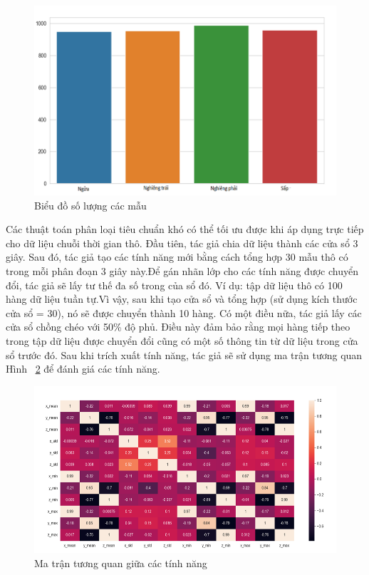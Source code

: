 \begin{figure} [!]
    \centering
    \includegraphics[width=0.75\linewidth]{images/hocmay_mau.png}
    \caption{Biểu đồ số lượng các mẫu}
    \label{hocmay_mau}
\end{figure}

Các thuật toán phân loại tiêu chuẩn khó có thể tối ưu được khi áp dụng trực tiếp cho dữ liệu chuỗi thời gian thô. Đầu tiên, tác giả chia dữ liệu thành các cửa sổ 3 giây. Sau đó, tác giả tạo các tính năng mới bằng cách tổng hợp 30 mẫu thô có trong mỗi phân đoạn 3 giây này.Để gán nhãn lớp cho các tính năng được chuyển đổi, tác giả sẽ lấy tư thế đa số trong của sổ đó. Ví dụ: tập dữ liệu thô có 100 hàng dữ liệu tuần tự.Vì vậy, sau khi tạo cửa sổ và tổng hợp (sử dụng kích thước cửa sổ = 30), nó sẽ được chuyển thành 10 hàng.
Có một điều nữa, tác giả lấy các cửa sổ chồng chéo với 50\% độ phủ. Điều này đảm bảo rằng mọi hàng tiếp theo trong tập dữ liệu được chuyển đổi cũng có một số thông tin từ dữ liệu trong cửa sổ trước đó.
Sau khi trích xuất tính năng, tác giả sẽ sử dụng ma trận tương quan Hình ~\ref{matrantuongquan} để đánh giá các tính năng.



\begin{figure}[!]
    \centering
    \includegraphics[width=1\linewidth]{images/matrantuongquan.png}
    \caption{Ma trận tương quan giữa các tính năng}
    \label{matrantuongquan}
\end{figure}

